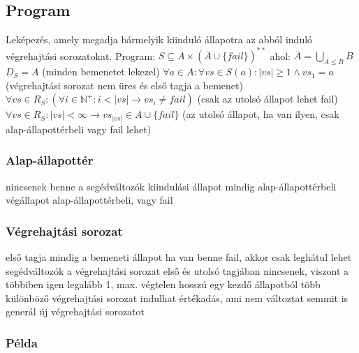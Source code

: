 \documentclass[12pt,a4paper]{article}
\begin{document}
\pagebreak

\subsection{Program}

\begin{outline}
	\1 Leképezés, amely megadja bármelyik kiinduló állapotra az abból induló végrehajtási sorozatokat.
	\1 Program: $S \subseteq A \times (\overline{A} \cup \{fail\})^{**}$ ahol:
		\2 $\overline{A} = \underset{A \le B}{\bigcup} B $
		\2 $D_S=A$ (minden bemenetet lekezel)
		\2 $\forall a \in A: \forall vs \in S(a): |vs| \ge 1 \wedge vs_1 = a$
		(végrehajtási sorozat nem üres és első tagja a bemenet)
		\2 $\forall vs \in R_S: (\forall i \in \mathbb{N}^+: i < |vs| \to vs_i \neq fail)$
		(csak az utolsó állapot lehet fail)
		\2 $\forall vs \in R_S: |vs|<\infty \to vs_{|vs|} \in A \cup \{fail\}$
		(az utolsó állapot, ha van ilyen, csak alap-állapottérbeli vagy fail lehet)
\end{outline}

\subsubsection{Alap-állapottér}

\begin{outline}
	\1 nincsenek benne a segédváltozók
	\1 kiindulási állapot mindig alap-állapottérbeli
	\1 végállapot alap-állapottérbeli, vagy fail
\end{outline}

\subsubsection{Végrehajtási sorozat}

\begin{outline}
	\1 első tagja mindig a bemeneti állapot
	\1 ha van benne fail, akkor csak leghátul lehet
	\1 segédváltozók a végrehajtási sorozat első és utolsó tagjában nincsenek, viszont a többiben igen
	\1 legalább 1, max. végtelen hosszú
	\1 egy kezdő állapotból több különböző végrehajtási sorozat indulhat
	\1 értékadás, ami nem változtat semmit is generál új végrehajtási sorozatot
\end{outline}

\subsubsection{Példa}
\end{document}

